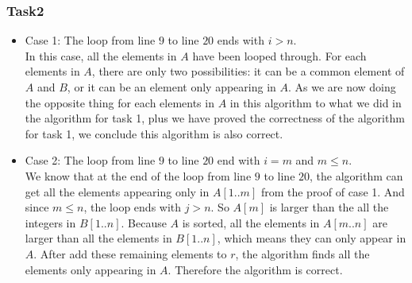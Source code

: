 \documentclass[letterpaper, 11pt]{article}
\begin{document}
\subsubsection{Task2}
\begin{itemize}
\item
Case 1: The loop from line $9$ to line $20$ ends with $i>n$.\\
In this case, all the elements in $A$ have been looped through. For each elements in $A$, there are only two possibilities: it can be a common element of $A$ and $B$, or it can be an element only appearing in $A$. As we are now doing the opposite thing for each elements in $A$ in this algorithm to what we did in the algorithm for task 1, plus we have proved the correctness of the algorithm for task 1, we conclude this algorithm is also correct.
\item
Case 2: The loop from line $9$ to line $20$ end with $i=m$ and $m \le n$.\\
We know that at the end of the loop from line $9$ to line $20$, the algorithm can get all the elements appearing only in $A[1..m]$ from the proof of case 1. And since $m \le n$, the loop ends with $j > n$. So $A[m]$ is larger than the all the integers in $B[1..n]$. Because $A$ is sorted, all the elements in $A[m..n]$ are larger than all the elements in $B[1..n]$, which means they can only appear in $A$. After add these remaining elements to $r$, the algorithm finds all the elements only appearing in $A$. Therefore the algorithm is correct.

\end{itemize}
\end{document}
